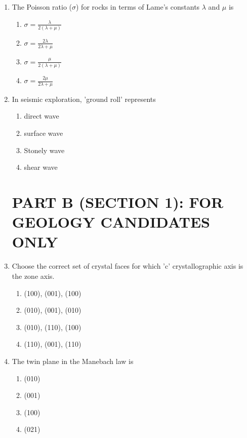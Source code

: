 \documentclass[journal,12pt,onecolumn]{IEEEtran}
\theoremstyle{remark}
\begin{document}
\begin{enumerate}
\item The Poisson ratio (\( \sigma \)) for rocks in terms of Lame's constants \( \lambda \) and \( \mu \) is
\begin{multicols}{4}
\begin{enumerate}
\item \( \sigma = \frac{\lambda}{2(\lambda + \mu)} \)  
\item \( \sigma = \frac{2\lambda}{2\lambda + \mu} \)  
\item \( \sigma = \frac{\mu}{2(\lambda + \mu)} \)  
\item \( \sigma = \frac{2\mu}{2\lambda + \mu} \)  
\end{enumerate}
\end{multicols}

\item In seismic exploration, 'ground roll' represents
\begin{multicols}{4}
\begin{enumerate}
\item direct wave  
\item surface wave  
\item Stonely wave  
\item shear wave  
\end{enumerate}
\end{multicols}
\newpage
\section*{\textbf{PART B (SECTION 1): FOR GEOLOGY CANDIDATES ONLY}}
\vspace{0.5cm}


\item Choose the correct set of crystal faces for which 'c' crystallographic axis is the zone axis.
\begin{multicols}{2}
\begin{enumerate}
\item (100), (001), (100)  
\item (010), (001), (010)  
\item (010), (110), (100)  
\item (110), (001), (110)  
\end{enumerate}
\end{multicols}

\item The twin plane in the Manebach law is
\begin{multicols}{4}
\begin{enumerate}
\item (010)  
\item (001)  
\item (100)  
\item (021)  
\end{enumerate}
\end{multicols}


\end{enumerate}
\end{document}
